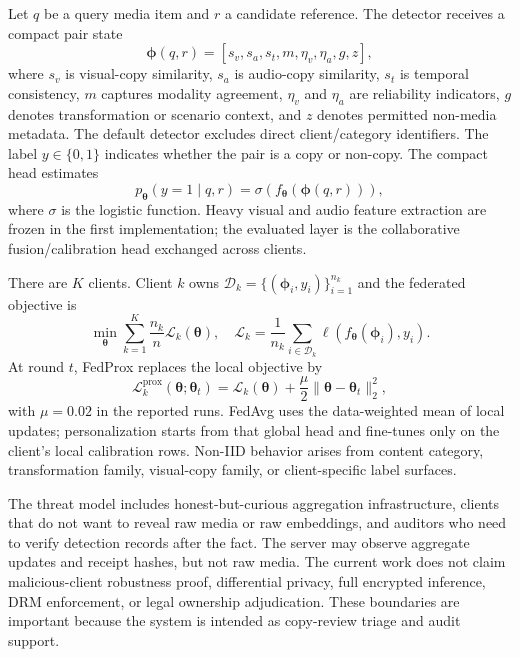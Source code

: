 \documentclass[journal]{IEEEtran}
\newcommand{\phitwin}{\boldsymbol{\phi}}
\newcommand{\thetavec}{\boldsymbol{\theta}}
\begin{document}
Let $q$ be a query media item and $r$ a candidate reference. The detector receives a compact pair state
\begin{equation}
\phitwin(q,r)=[s_v,s_a,s_t,m,\eta_v,\eta_a,g,z],
\end{equation}
where $s_v$ is visual-copy similarity, $s_a$ is audio-copy similarity, $s_t$ is temporal consistency, $m$ captures modality agreement, $\eta_v$ and $\eta_a$ are reliability indicators, $g$ denotes transformation or scenario context, and $z$ denotes permitted non-media metadata. The default detector excludes direct client/category identifiers. The label $y\in\{0,1\}$ indicates whether the pair is a copy or non-copy. The compact head estimates
\begin{equation}
 p_{\thetavec}(y=1\mid q,r)=\sigma(f_{\thetavec}(\phitwin(q,r))),
\end{equation}
where $\sigma$ is the logistic function. Heavy visual and audio feature extraction are frozen in the first implementation; the evaluated layer is the collaborative fusion/calibration head exchanged across clients.

There are $K$ clients. Client $k$ owns $\mathcal{D}_k=\{(\phitwin_i,y_i)\}_{i=1}^{n_k}$ and the federated objective is
\begin{equation}
\min_{\thetavec}\sum_{k=1}^{K}\frac{n_k}{n}\mathcal{L}_k(\thetavec),\quad
\mathcal{L}_k=\frac{1}{n_k}\sum_{i\in\mathcal{D}_k}\ell(f_{\thetavec}(\phitwin_i),y_i).
\end{equation}
At round $t$, FedProx replaces the local objective by
\begin{equation}
\mathcal{L}^{\mathrm{prox}}_k(\thetavec;\thetavec_t)=\mathcal{L}_k(\thetavec)+\frac{\mu}{2}\lVert\thetavec-\thetavec_t\rVert_2^2,
\end{equation}
with $\mu=0.02$ in the reported runs. FedAvg uses the data-weighted mean of local updates; personalization starts from that global head and fine-tunes only on the client's local calibration rows.
Non-IID behavior arises from content category, transformation family, visual-copy family, or client-specific label surfaces.

The threat model includes honest-but-curious aggregation infrastructure, clients that do not want to reveal raw media or raw embeddings, and auditors who need to verify detection records after the fact. The server may observe aggregate updates and receipt hashes, but not raw media. The current work does not claim malicious-client robustness proof, differential privacy, full encrypted inference, DRM enforcement, or legal ownership adjudication. These boundaries are important because the system is intended as copy-review triage and audit support.
\end{document}
